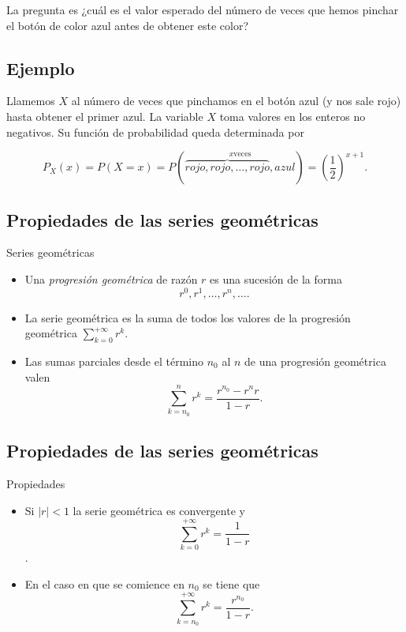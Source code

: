 \documentclass[]{book}
\providecommand{\tightlist}{%
  \setlength{\itemsep}{0pt}\setlength{\parskip}{0pt}}
\begin{document}
La pregunta es ¿cuál es el valor esperado del
número de veces que hemos pinchar el botón de color azul antes de obtener este color?

\hypertarget{ejemplo-15}{%
\subsection{Ejemplo}\label{ejemplo-15}}

Llamemos \(X\) al número de veces que pinchamos en el botón azul (y nos sale rojo) hasta
obtener el primer azul. La variable \(X\) toma valores en los enteros no negativos. Su
función de probabilidad queda determinada por

\[
P_X(x)=P(X=x)=P(\stackrel{x \mbox{veces}}{\overbrace{rojo, rojo,\ldots,rojo},azul})
=\left(\frac12\right)^{x+1}.
\]

\hypertarget{propiedades-de-las-series-geomuxe9tricas}{%
\subsection{Propiedades de las series geométricas}\label{propiedades-de-las-series-geomuxe9tricas}}

Series geométricas

\begin{itemize}
\tightlist
\item
  Una \emph{progresión geométrica} de razón \(r\) es una sucesión de la forma\\
  \[
  r^0, r^1,\ldots,r^n,\ldots.
  \]
\item
  La serie geométrica es la suma de todos los
  valores de la progresión geométrica \(\displaystyle\sum_{k=0}^{+\infty} r^k\).
\item
  Las sumas parciales desde el término \(n_0\) al \(n\) de una progresión geométrica valen
  \[
  \sum_{k=n_0}^n r^k=\frac{r^{n_0}- r^n r}{1-r}.
  \]
\end{itemize}

\hypertarget{propiedades-de-las-series-geomuxe9tricas-1}{%
\subsection{Propiedades de las series geométricas}\label{propiedades-de-las-series-geomuxe9tricas-1}}

Propiedades

\begin{itemize}
\tightlist
\item
  Si \(|r|<1\) la serie geométrica es convergente y \[\sum_{k=0}^{+\infty }
  r^k=\frac1{1-r}\].
\item
  En el caso en que se comience en \(n_0\) se tiene que
  \[\sum_{k=n_0}^{+\infty} r^k=\frac{r^{n_0}}{1-r}.\]
\end{itemize}
\end{document}
